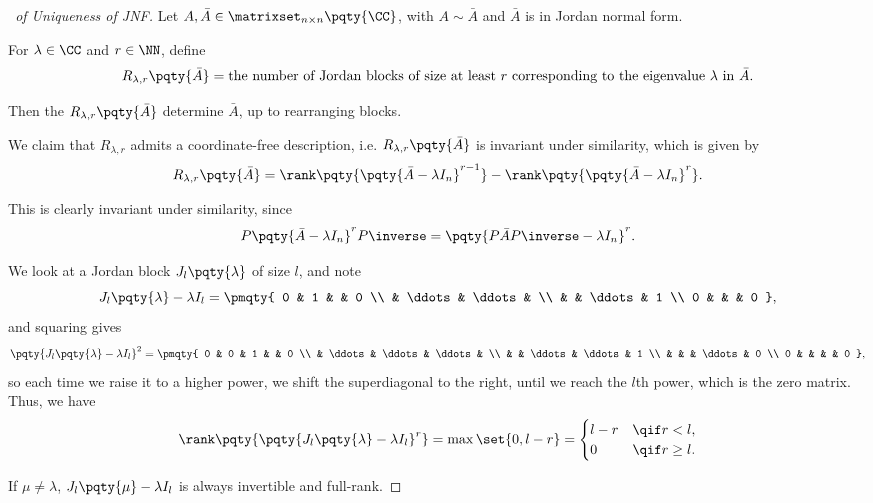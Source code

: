 \begin{proof}[\proofname\ of Uniqueness of JNF]
    Let \(A, \bar{A} \in \matrixset_{n \times n} \pqty{\CC}\), with \(A \sim \bar{A}\) and \(\bar{A}\) is in Jordan normal form.

    For \(\lambda \in \CC\) and \(r \in \NN\), define
    \[
        R_{\lambda, r} \pqty{\bar{A}} = \text{the number of Jordan blocks of size at least \(r\) corresponding to the eigenvalue \(\lambda\) in \(\bar{A}\)}.
    \]

    Then the \(R_{\lambda, r} \pqty{\bar{A}}\) determine \(\bar{A}\), up to rearranging blocks.

    We claim that \(R_{\lambda, r}\) admits a coordinate-free description, i.e. \(R_{\lambda, r} \pqty{\bar{A}}\) is invariant under similarity, which is given by
    \[
        R_{\lambda, r} \pqty{\bar{A}} = \rank \pqty{\pqty{\bar{A} - \lambda I_n}^{r - 1}} - \rank \pqty{\pqty{\bar{A} - \lambda I_n}^{r}}.
    \]

    This is clearly invariant under similarity, since
    \[
        P \pqty{\bar{A} - \lambda I_n}^{r} P\inverse = \pqty{P \bar{A} P\inverse - \lambda I_n}^{r}.
    \]

    We look at a Jordan block \(J_l \pqty{\lambda}\) of size \(l\), and note
    \[
        J_l \pqty{\lambda} - \lambda I_l = \pmqty{
            0 & 1 & & 0 \\
             & \ddots & \ddots & \\
             & & \ddots & 1 \\
            0 & & & 0
        },
    \]
    and squaring gives
    \[
        \pqty{J_l \pqty{\lambda} - \lambda I_l}^2 = \pmqty{
            0 & 0 & 1 & & 0 \\
             & \ddots & \ddots & \ddots & \\
             & & \ddots & \ddots & 1 \\
             & & & \ddots & 0 \\
            0 & & & & 0
        },
    \]
    so each time we raise it to a higher power, we shift the superdiagonal to the right, until we reach the \(l\)th power, which is the zero matrix. Thus, we have
    \[
        \rank\pqty{\pqty{J_l \pqty{\lambda} - \lambda I_l}^{r}} = \max\set{0, l - r} = \begin{cases}
            l - r & \qif r < l, \\
            0 & \qif r \geq l.
        \end{cases}
    \]

    If \(\mu \neq \lambda\), \(J_l \pqty{\mu} - \lambda I_l\) is always invertible and full-rank.


\end{proof}
